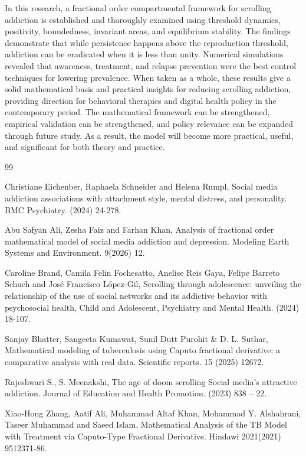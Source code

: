 \documentclass[10pt]{NSP1}
\begin{document}
In this research, a fractional order compartmental framework for scrolling addiction is established and thoroughly examined using threshold dynamics, positivity, boundedness, invariant areas, and equilibrium stability. The findings demonstrate that while persistence happens above the reproduction threshold, addiction can be eradicated when it is less than unity. Numerical simulations revealed that awareness, treatment, and relapse prevention were the best control techniques for lowering prevalence. When taken as a whole, these results give a solid mathematical basis and practical insights for reducing scrolling addiction, providing direction for behavioral therapies and digital health policy in the contemporary period. The mathematical framework can be strengthened, empirical validation can be strengthened, and policy relevance can be expanded through future study. As a result, the model will become more practical, useful, and significant for both theory and practice.

99

Christiane Eichenber, Raphaela Schneider and Helena Rumpl, Social media addiction associations with attachment style, mental distress, and personality. BMC Psychiatry. (2024) 24-278.

Abu Safyan Ali, Zesha Faiz and Farhan Khan, Analysis of fractional order mathematical model of social media addiction and depression. Modeling Earth Systems and Environment. 9(2026) 12.

Caroline Brand, Camila Felin Fochesatto, Anelise Reis Gaya, Felipe Barreto Schuch and José Francisco López-Gil, Scrolling through adolescence: unveiling the relationship of the use of social networks and its addictive behavior with psychosocial health, Child and Adolescent, Psychiatry and Mental Health. (2024) 18-107.

Sanjay Bhatter, Sangeeta Kumawat, Sunil Dutt Purohit \& D. L. Suthar, Mathematical modeling of tuberculosis using Caputo fractional derivative: a comparative analysis with real data. Scientific reports. 15 (2025) 12672.

Rajeshwari S., S. Meenakshi, The age of doom scrolling Social media’s attractive addiction. Journal of Education and Health Promotion. (2023) 838 – 22.

Xiao-Hong Zhang, Aatif Ali, Muhammad Altaf Khan, Mohammad Y. Alshahrani, Taseer Muhammad and Saeed Islam, Mathematical Analysis of the TB Model with Treatment via Caputo-Type Fractional Derivative. Hindawi 2021(2021) 9512371-86.
\end{document}

